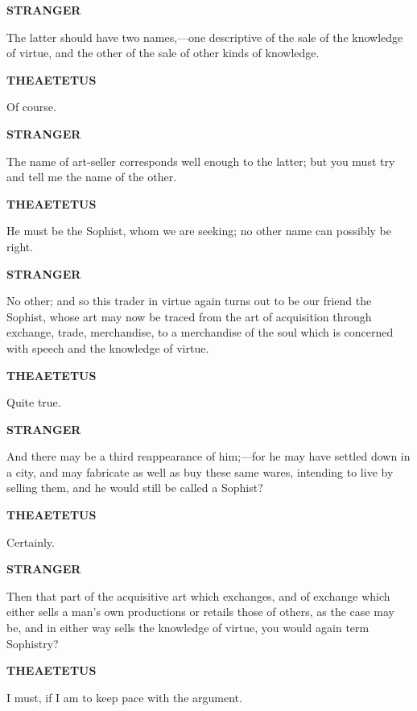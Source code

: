 \documentclass[11pt,letter]{article}
\begin{document}
\par \textbf{STRANGER}
\par   The latter should have two names,—one descriptive of the sale of the knowledge of virtue, and the other of the sale of other kinds of knowledge.

\par \textbf{THEAETETUS}
\par   Of course.

\par \textbf{STRANGER}
\par   The name of art-seller corresponds well enough to the latter; but you must try and tell me the name of the other.

\par \textbf{THEAETETUS}
\par   He must be the Sophist, whom we are seeking; no other name can possibly be right.

\par \textbf{STRANGER}
\par   No other; and so this trader in virtue again turns out to be our friend the Sophist, whose art may now be traced from the art of acquisition through exchange, trade, merchandise, to a merchandise of the soul which is concerned with speech and the knowledge of virtue.

\par \textbf{THEAETETUS}
\par   Quite true.

\par \textbf{STRANGER}
\par   And there may be a third reappearance of him;—for he may have settled down in a city, and may fabricate as well as buy these same wares, intending to live by selling them, and he would still be called a Sophist?

\par \textbf{THEAETETUS}
\par   Certainly.

\par \textbf{STRANGER}
\par   Then that part of the acquisitive art which exchanges, and of exchange which either sells a man's own productions or retails those of others, as the case may be, and in either way sells the knowledge of virtue, you would again term Sophistry?

\par \textbf{THEAETETUS}
\par   I must, if I am to keep pace with the argument.
\end{document}
